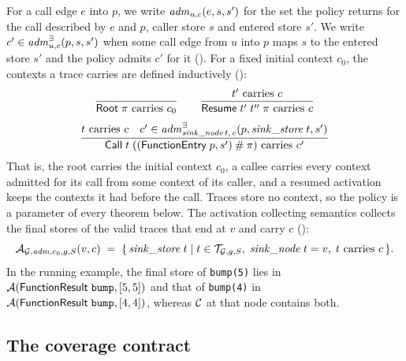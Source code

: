 For a call edge $e$ into $p$, we write $\mathit{adm}_{u,c}(e, s, s')$ for the set the
policy returns for the call described by $e$ and $p$, caller store $s$ and
entered store $s'$. We write $c' \in \mathit{adm}^{\exists}_{u,c}(p, s, s')$ when some call edge from $u$
into $p$ maps $s$ to the entered store $s'$ and the policy admits $c'$ for it
(). For a fixed initial context $c_0$, the contexts a trace carries are defined
inductively ():
\begin{gather*}
\frac{}{\textsf{Root}\;\pi \text{ carries } c_0}
\qquad
\frac{t' \text{ carries } c}{\textsf{Resume}\;t'\;t''\;\pi \text{ carries } c}
\\[1ex]
\frac{t \text{ carries } c \quad c' \in \mathit{adm}^{\exists}_{\mathit{sink\_node}\,t,\,c}(p, \mathit{sink\_store}\;t, s')}{\textsf{Call}\;t\;((\textsf{FunctionEntry}\;p, s') \mathbin{\#} \pi) \text{ carries } c'}
\end{gather*}
That is, the root carries the initial context $c_0$, a callee carries every
context admitted for its call from some context of its caller, and a resumed activation keeps the contexts it had
before the call. Traces store no context, so the policy is a parameter of
every theorem below. The activation collecting semantics collects the final
stores of the valid traces that end at $v$ and carry $c$
():
\[
\mathcal{A}_{\mathcal{G},\mathit{adm},c_0,g,S}(v, c) \;=\; \{\, \mathit{sink\_store}\;t \mid t \in \mathcal{T}_{\mathcal{G},g,S},\; \mathit{sink\_node}\;t = v,\; t \text{ carries } c \,\}.
\]
In the running example, the final store of \texttt{bump(5)} lies in
$\mathcal{A}(\textsf{FunctionResult}\;\texttt{bump}, [5,5])$ and that of
\texttt{bump(4)} in $\mathcal{A}(\textsf{FunctionResult}\;\texttt{bump}, [4,4])$,
whereas $\mathcal{C}$ at that node contains both.

\subsection{The coverage contract}

